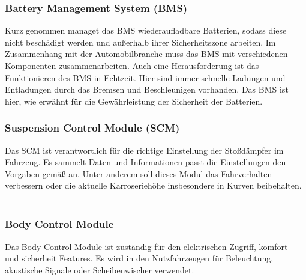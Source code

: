         \subsubsection{Battery Management System (BMS)}
        Kurz genommen managet das BMS wiederaufladbare Batterien, sodass diese nicht beschädigt werden und außerhalb ihrer
        Sicherheitszone arbeiten. Im Zusammenhang mit der Automobilbranche muss das BMS mit verschiedenen Komponenten
        zusammenarbeiten. Auch eine Herausforderung ist das Funktionieren des BMS in Echtzeit. Hier sind immer schnelle
        Ladungen und Entladungen durch das Bremsen und Beschleunigen vorhanden. Das BMS ist hier, wie erwähnt für die
        Gewährleistung der Sicherheit der Batterien.
        ~\cite{BMS.PB1} ~\cite{BMS.PB2}

        \subsubsection{Suspension Control Module (SCM)}
        Das SCM ist verantwortlich für die richtige Einstellung der Stoßdämpfer im Fahrzeug. Es sammelt Daten und Informationen
        passt die Einstellungen den Vorgaben gemäß an. Unter anderem soll dieses Modul das Fahrverhalten verbessern oder
        die aktuelle Karroseriehöhe insbesondere in Kurven beibehalten.
        ~\cite{suspensioncontrol.PB1}

        \subsubsection{Body Control Module}
        Das Body Control Module ist zuständig für den elektrischen Zugriff, komfort- und sicherheit Features. Es wird in
        den Nutzfahrzeugen für Beleuchtung, akustische Signale oder Scheibenwischer verwendet.
        ~\cite{BCM.PB1}
